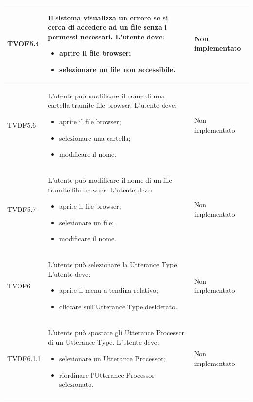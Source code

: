 \documentclass[openany,12pt,a4paper]{report}
\begin{document}
\begin{longtable}{| p{3cm} |p{8cm} | p{2.5cm} |}
	\newline TVOF5.4&
	\newline Il sistema visualizza un errore se si cerca di accedere ad un file senza i permessi necessari. L'utente deve:
	\begin{itemize}
		\item aprire il file browser;
		\item selezionare un file non accessibile.
	\end{itemize}&
	\newline Non implementato
	\\[1em]	
	\hline
	
	\newline TVDF5.6&
	\newline L'utente può modificare il nome di una cartella tramite file browser. L'utente deve:
	\begin{itemize}
		\item aprire il file browser;
		\item selezionare una cartella;
		\item modificare il nome.
	\end{itemize}&
	\newline Non implementato
	\\[1em]
	\hline
	\newline TVDF5.7&
	\newline L'utente può modificare il nome di un file tramite file browser. L'utente deve:
	\begin{itemize}
		\item aprire il file browser;
		\item selezionare un file;
		\item modificare il nome.
	\end{itemize}&
	\newline Non implementato
	\\[1em]
	\hline
	\newline TVOF6&
	\newline L'utente può selezionare la Utterance Type. L'utente deve:
	\begin{itemize}
		\item aprire il menu a tendina relativo;
		\item cliccare sull'Utterance Type desiderato.
	\end{itemize}&
	\newline Non implementato
	\\[1em]
	\hline
	
	\newline TVDF6.1.1&
	\newline L'utente può spostare gli Utterance Processor di un Utterance Type. L'utente deve:
	\begin{itemize}
		\item selezionare un Utterance Processor;
		\item riordinare l'Utterance Processor selezionato.
	\end{itemize}&
	\newline Non implementato
	\\[1em]
	\hline	
	

\end{longtable}
\end{document}
